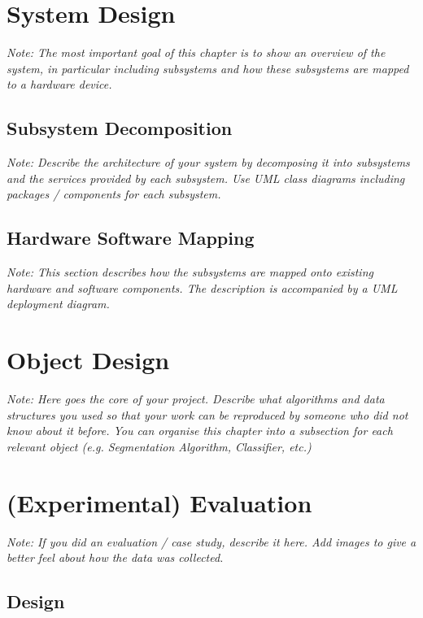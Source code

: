 \documentclass[a4paper,12pt,twoside]{report}
\begin{document}

\chapter{System Design}

\textit{Note: The most important goal of this chapter is to show an overview of the system, in particular including subsystems and how these subsystems are mapped to a hardware device.}

\section{Subsystem Decomposition}

\textit{Note: Describe the architecture of your system by decomposing it into subsystems and the services provided by each subsystem. Use UML class diagrams including packages / components for each subsystem.}

\section{Hardware Software Mapping}

\textit{Note: This section describes how the subsystems are mapped onto existing hardware and software components. The description is accompanied by a UML deployment diagram.}

\chapter{Object Design}

\textit{Note: Here goes the core of your project. Describe what algorithms and data structures you used so that your work can be reproduced by someone who did not know about it before. You can organise this chapter into a subsection for each relevant object (e.g. Segmentation Algorithm, Classifier, etc.)}


\chapter{(Experimental) Evaluation}

\textit{Note: If you did an evaluation / case study, describe it here. Add images to give a better feel about how the data was collected.}

\section{Design}
\end{document}
